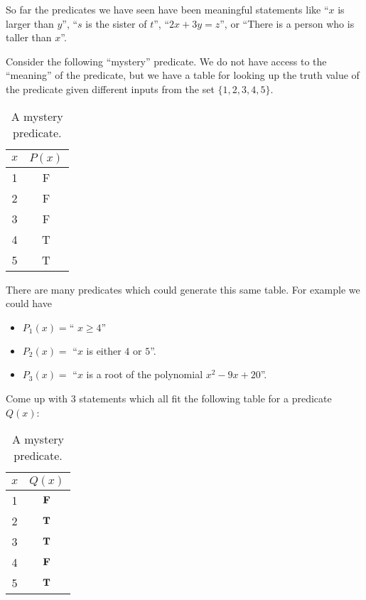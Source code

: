 	So far the predicates we have seen have been meaningful statements like ``$x$ is larger than $y$'', ``$s$ is the sister of $t$'', ``$2x+3y = z$'',  or ``There is a person who is taller than $x$''.

Consider the following ``mystery'' predicate.  We do not have access to the ``meaning'' of the predicate, but we have a table for looking up the truth value of the predicate given different inputs from the set $\{1,2,3,4,5\}$.

\begin{table}[h!]
	\begin{center}
		\caption{A mystery predicate.}
		\begin{tabular}{c|c} %
			
			$x$ & $P(x)$ \\
			\hline
			1 & F \\ 
			2 & F \\
			3 & F \\
			4 & T \\
			5 & T 
		\end{tabular}
	\end{center}
\end{table}

There are many predicates which could generate this same table.  For example we could have

\begin{itemize}
	\item \(P_1(x) = \textrm{`` $x \geq 4$''}\)\\
	\item $P_2(x)=$ ``$x$ is either $4$ or $5$''.\\
	\item $P_3(x) =$ ``$x$ is a root of the polynomial $x^2 - 9x+20$''.\\
\end{itemize}

\begin{xca}
	Come up with 3 statements which all fit the following table for a predicate $Q(x)$:
	
	\begin{table}[h!]
		\begin{center}
			\caption{A mystery predicate.}
			\label{tab:table1}
			\begin{tabular}{c|c} %
				
				$x$ & $Q(x)$ \\
				\hline
				1 & $\textbf{\textrm{F}}$ \\ 
				2 & $\textbf{\textrm{T}}$ \\
				3 & $\textbf{\textrm{T}}$ \\
				4 & $\textbf{\textrm{F}}$ \\
				5 & $\textbf{\textrm{T}}$ 
			\end{tabular}
		\end{center}
	\end{table}
	
\end{xca}


